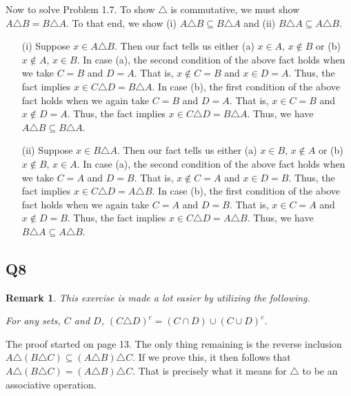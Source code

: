 \documentclass[12pt]{article}
\newtheorem{remark}{Remark}
\numberwithin{theorem}{section}
\numberwithin{equation}{section}
\numberwithin{remark}{section}
\numberwithin{definition}{section}
\numberwithin{theorem}{section}
\numberwithin{lemma}{section}
\numberwithin{example}{section}
\begin{document}
Now to solve Problem 1.7. To show $\triangle$ is commutative, we must show $A \triangle B = B \triangle A$. To that end, we show (i) $A \triangle B \subseteq B \triangle A$ and (ii) $B \triangle A \subseteq A \triangle B$.
\begin{itemize}
	\item[(i)]{Suppose $x\in A\triangle B$. Then our fact tells us either (a) $x\in A$, $x\notin B$ or (b) $x\notin A$, $x \in B$. In case (a), the second condition of the above fact holds when we take $C = B$ and $D = A$. That is, $x \notin C = B$ and $x \in D = A$. Thus, the fact implies $x \in C \triangle  D = B \triangle A$. In case (b), the first condition of the above fact holds when we again take $C = B$ and $D = A$. That is, $x \in C = B$ and $x \notin D = A$. Thus, the fact implies $x \in C \triangle D = B \triangle A$. Thus, we have $A \triangle B \subseteq B \triangle A$.}
	\item[(ii)]{Suppose $x\in B\triangle A$. Then our fact tells us either (a) $x\in B$, $x\notin A$ or (b) $x\notin B$, $x \in A$. In case (a), the second condition of the above fact holds when we take $C = A$ and $D = B$. That is, $x \notin C = A$ and $x \in D = B$. Thus, the fact implies $x \in C \triangle  D = A \triangle B$. In case (b), the first condition of the above fact holds when we again take $C = A$ and $D = B$. That is, $x \in C = A$ and $x \notin D = B$. Thus, the fact implies $x \in C \triangle D = A \triangle B$. Thus, we have $B \triangle A \subseteq A \triangle B$.}
\end{itemize}

\subsection{Q8}

\begin{remark}
	This exercise is made a lot easier by utilizing the following.
	\begin{center}
		For any sets, $C$ and $D$, $(C \triangle D)^c = (C \cap D) \cup (C \cup D)^c$.
	\end{center}
\end{remark}

The proof started on page 13. The only thing remaining is the reverse inclusion $A \triangle (B \triangle C) \subseteq (A \triangle B) \triangle C$. If we prove this, it then follows that $A \triangle (B \triangle C) = (A \triangle B) \triangle C$. That is precisely what it means for $\triangle$ to be an associative operation.
\end{document}
